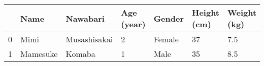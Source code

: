 \begin{tabular}{lllllll}
\toprule
{} &      Name &      Nawabari & Age (year) &  Gender & Height (cm) & Weight (kg) \\
\midrule
0 &      Mimi &  Musashisakai &          2 &  Female &          37 &         7.5 \\
1 &  Mamesuke &        Komaba &          1 &    Male &          35 &         8.5 \\
\bottomrule
\end{tabular}
